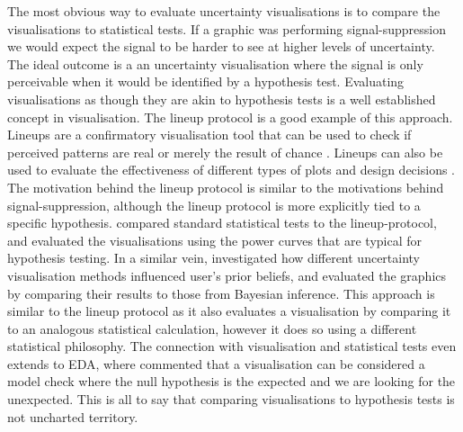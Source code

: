 \documentclass[
  12pt]{article}
\begin{document}
The most obvious way to evaluate uncertainty visualisations is to
compare the visualisations to statistical tests. If a graphic was
performing signal-suppression we would expect the signal to be harder to
see at higher levels of uncertainty. The ideal outcome is a an
uncertainty visualisation where the signal is only perceivable when it
would be identified by a hypothesis test. Evaluating visualisations as
though they are akin to hypothesis tests is a well established concept
in visualisation. The lineup protocol is a good example of this
approach. Lineups are a confirmatory visualisation tool that can be used
to check if perceived patterns are real or merely the result of chance
\citep{Buja2009, Wickham2010}. Lineups can also be used to evaluate the
effectiveness of different types of plots \citep{Hofmann2012} and design
decisions \citep{vanderplas2017}. The motivation behind the lineup
protocol is similar to the motivations behind signal-suppression,
although the lineup protocol is more explicitly tied to a specific
hypothesis. \citet{Patrick2023} compared standard statistical tests to
the lineup-protocol, and evaluated the visualisations using the power
curves that are typical for hypothesis testing. In a similar vein,
\citet{Kim2019} investigated how different uncertainty visualisation
methods influenced user's prior beliefs, and evaluated the graphics by
comparing their results to those from Bayesian inference. This approach
is similar to the lineup protocol as it also evaluates a visualisation
by comparing it to an analogous statistical calculation, however it does
so using a different statistical philosophy. The connection with
visualisation and statistical tests even extends to EDA, where
\citet{Hullman2021} commented that a visualisation can be considered a
model check where the null hypothesis is the expected and we are looking
for the unexpected. This is all to say that comparing visualisations to
hypothesis tests is not uncharted territory.
\end{document}
